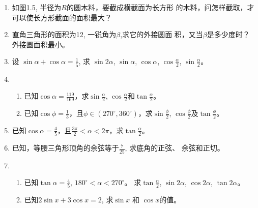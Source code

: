 \begin{enumerate}
\item 如图1.5, 半径为$R$的圆木料，要截成横截面为长方形
的木料，问怎样截取，才可以使长方形截面的面积最大？
\begin{figure}[htp]
    \centering
{}
    \caption{}
\end{figure}


\item 直角三角形的面积为12, 一锐角为$\beta$,求它的外接圆面
积，又当$\beta$是多少度时？外接圆面积最小。
\item 设 $\sin\alpha +\cos\alpha=\frac{1}{5}$,
求 $\sin2\alpha$, $\sin\alpha$, $\cos\alpha$, $\cos \frac{\alpha}{2}$, $\sin \frac{\alpha}{2}$。

\item \begin{enumerate}
    \item 已知$\cos\alpha =\frac{119}{169}$，求$\sin\frac{\alpha}{2}$, $\cos\frac{\alpha}{2}$和$\tan\frac{\alpha}{2}$。
    \item 已知$\cos\phi=\frac{1}{3}$，且$\phi\in(270^{\circ}, 360^{\circ})$，求$\sin\frac{\phi}{2}$, $\cos\frac{\phi}{2}$及$\tan\frac{\phi}{2}$。
\end{enumerate}
\item 已知$\cos\alpha=\frac{4}{5}$，且$\frac{3\pi}{2}<\alpha<2\pi$，求$\tan\frac{\alpha}{2}$。
\item 已知，等腰三角形顶角的余弦等于$\frac{7}{25}$, 求底角的正弦、
余弦和正切。
\item \begin{enumerate}
    \item 已知$\tan\alpha=\frac{4}{5}$, $180^{\circ}<\alpha<270^{\circ}$。
求$\tan\frac{\alpha}{2}$, $\sin2\alpha$, $\cos2\alpha$, $\tan 2\alpha$。
\item 已知$2\sin x+3\cos x=2$, 
求$\sin x$ 和 $\cos x$的值。
\end{enumerate}


\end{enumerate}
